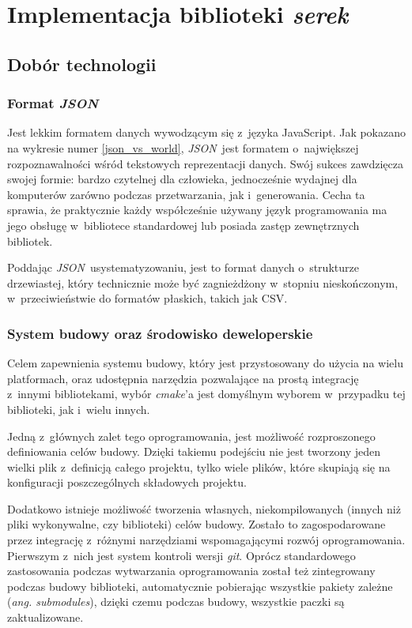 \documentclass[12pt]{article}
\newcommand{\n}{\newline}
\newcommand{\nonpl}[1]{{\it #1}}
\newcommand{\ang}[1]{\nonpl{ang. #1}}
\newcommand{\JSON}{\nonpl{JSON}}
\newcommand{\serek}{\nonpl{serek}}
\begin{document}
	{
		\section{Implementacja biblioteki \serek}\label{serek}

		{
			\subsection{Dobór technologii}

			{
				\subsubsection{Format \JSON}

				Jest lekkim formatem danych wywodzącym się z~języka JavaScript. Jak pokazano na wykresie numer \ref{json_vs_world},
				\JSON~jest formatem o~największej rozpoznawalności wśród tekstowych reprezentacji danych. Swój sukces
				zawdzięcza swojej formie: bardzo czytelnej dla człowieka, jednocześnie wydajnej dla komputerów zarówno
				podczas przetwarzania, jak i~generowania. Cecha ta sprawia, że praktycznie każdy współcześnie używany język
				programowania ma jego obsługę\cite{json_short} w~bibliotece standardowej lub posiada zastęp zewnętrznych
				bibliotek.\n

				Poddając \JSON~usystematyzowaniu, jest to format danych o~strukturze drzewiastej, który technicznie
				może być zagnieżdżony w~stopniu nieskończonym, w~przeciwieństwie do formatów płaskich, takich jak CSV.\n
			}

			{
				\subsubsection{System budowy oraz środowisko deweloperskie}

				Celem zapewnienia systemu budowy, który jest przystosowany do użycia na wielu platformach, oraz udostępnia narzędzia pozwalające na prostą
				integrację z~innymi bibliotekami, wybór \nonpl{cmake}'a\cite{cmake_docs} jest domyślnym wyborem w~przypadku tej biblioteki, jak i~wielu innych.\n

				Jedną z~głównych zalet tego oprogramowania, jest możliwość rozproszonego definiowania celów budowy. Dzięki takiemu podejściu nie jest tworzony
				jeden wielki plik z~definicją całego projektu, tylko wiele plików, które skupiają się na konfiguracji poszczególnych składowych projektu.\n

				Dodatkowo istnieje możliwość tworzenia własnych, niekompilowanych (innych niż pliki wykonywalne, czy biblioteki) celów budowy. Zostało to zagospodarowane
				przez integrację z~różnymi narzędziami wspomagającymi rozwój oprogramowania. Pierwszym z~nich jest system kontroli wersji \nonpl{git}\cite{git_docs}. Oprócz standardowego
				zastosowania podczas wytwarzania oprogramowania został też zintegrowany podczas budowy biblioteki, automatycznie pobierając wszystkie pakiety zależne
				(\ang{submodules}), dzięki czemu podczas budowy, wszystkie paczki są zaktualizowane.\n

}}}
\end{document}
